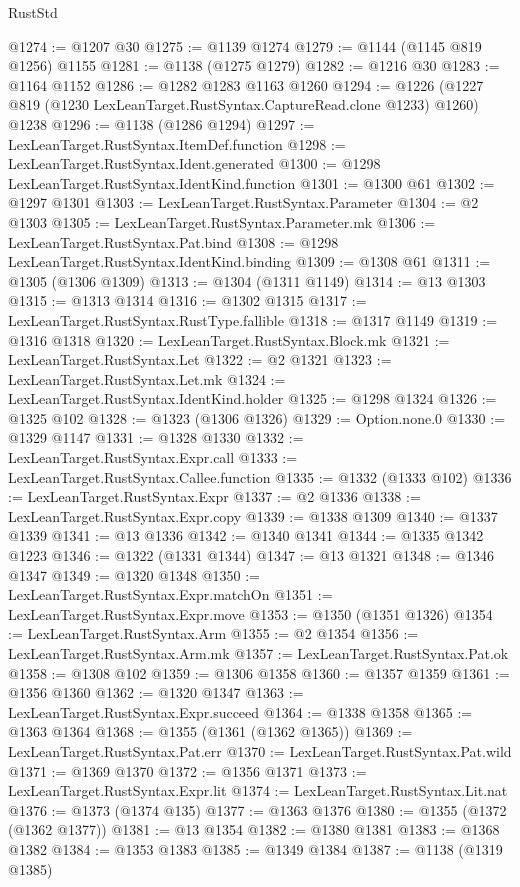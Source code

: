\begin{lexlean}{RustStd}
\begin{coremodule}
@1274 := @1207 @30
@1275 := @1139 @1274
@1279 := @1144 (@1145 @819 @1256) @1155
@1281 := @1138 (@1275 @1279)
@1282 := @1216 @30
@1283 := @1164 @1152
@1286 := @1282 @1283 @1163 @1260
@1294 := @1226 (@1227 @819 (@1230 LexLeanTarget.RustSyntax.CaptureRead.clone @1233) @1260) @1238
@1296 := @1138 (@1286 @1294)
@1297 := LexLeanTarget.RustSyntax.ItemDef.function
@1298 := LexLeanTarget.RustSyntax.Ident.generated
@1300 := @1298 LexLeanTarget.RustSyntax.IdentKind.function
@1301 := @1300 @61
@1302 := @1297 @1301
@1303 := LexLeanTarget.RustSyntax.Parameter
@1304 := @2 @1303
@1305 := LexLeanTarget.RustSyntax.Parameter.mk
@1306 := LexLeanTarget.RustSyntax.Pat.bind
@1308 := @1298 LexLeanTarget.RustSyntax.IdentKind.binding
@1309 := @1308 @61
@1311 := @1305 (@1306 @1309)
@1313 := @1304 (@1311 @1149)
@1314 := @13 @1303
@1315 := @1313 @1314
@1316 := @1302 @1315
@1317 := LexLeanTarget.RustSyntax.RustType.fallible
@1318 := @1317 @1149
@1319 := @1316 @1318
@1320 := LexLeanTarget.RustSyntax.Block.mk
@1321 := LexLeanTarget.RustSyntax.Let
@1322 := @2 @1321
@1323 := LexLeanTarget.RustSyntax.Let.mk
@1324 := LexLeanTarget.RustSyntax.IdentKind.holder
@1325 := @1298 @1324
@1326 := @1325 @102
@1328 := @1323 (@1306 @1326)
@1329 := Option.none.{0}
@1330 := @1329 @1147
@1331 := @1328 @1330
@1332 := LexLeanTarget.RustSyntax.Expr.call
@1333 := LexLeanTarget.RustSyntax.Callee.function
@1335 := @1332 (@1333 @102)
@1336 := LexLeanTarget.RustSyntax.Expr
@1337 := @2 @1336
@1338 := LexLeanTarget.RustSyntax.Expr.copy
@1339 := @1338 @1309
@1340 := @1337 @1339
@1341 := @13 @1336
@1342 := @1340 @1341
@1344 := @1335 @1342 @1223
@1346 := @1322 (@1331 @1344)
@1347 := @13 @1321
@1348 := @1346 @1347
@1349 := @1320 @1348
@1350 := LexLeanTarget.RustSyntax.Expr.matchOn
@1351 := LexLeanTarget.RustSyntax.Expr.move
@1353 := @1350 (@1351 @1326)
@1354 := LexLeanTarget.RustSyntax.Arm
@1355 := @2 @1354
@1356 := LexLeanTarget.RustSyntax.Arm.mk
@1357 := LexLeanTarget.RustSyntax.Pat.ok
@1358 := @1308 @102
@1359 := @1306 @1358
@1360 := @1357 @1359
@1361 := @1356 @1360
@1362 := @1320 @1347
@1363 := LexLeanTarget.RustSyntax.Expr.succeed
@1364 := @1338 @1358
@1365 := @1363 @1364
@1368 := @1355 (@1361 (@1362 @1365))
@1369 := LexLeanTarget.RustSyntax.Pat.err
@1370 := LexLeanTarget.RustSyntax.Pat.wild
@1371 := @1369 @1370
@1372 := @1356 @1371
@1373 := LexLeanTarget.RustSyntax.Expr.lit
@1374 := LexLeanTarget.RustSyntax.Lit.nat
@1376 := @1373 (@1374 @135)
@1377 := @1363 @1376
@1380 := @1355 (@1372 (@1362 @1377))
@1381 := @13 @1354
@1382 := @1380 @1381
@1383 := @1368 @1382
@1384 := @1353 @1383
@1385 := @1349 @1384
@1387 := @1138 (@1319 @1385)

\end{coremodule}
\end{lexlean}
